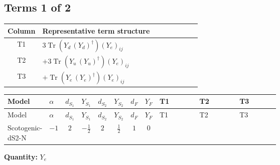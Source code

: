 \documentclass[8pt]{article}
\begin{document}
\begin{landscape}
\subsection*{Terms 1 of 2}
\begin{center}
\begin{tabular}{@{}c >{\raggedright\arraybackslash}p{0.82\linewidth}@{}}
\toprule
Column & Representative term structure \\
\midrule
T1 & \(\displaystyle 3 \operatorname{Tr}\!\left({Y_d}\,\left({Y_d}\right)^{\dagger}\right) \left({Y_e}\right)_{ij}\) \\
\midrule
T2 & \(\displaystyle +3 \operatorname{Tr}\!\left({Y_u}\,\left({Y_u}\right)^{\dagger}\right) \left({Y_e}\right)_{ij}\) \\
\midrule
T3 & \(\displaystyle +\operatorname{Tr}\!\left({Y_e}\,\left({Y_e}\right)^{\dagger}\right) \left({Y_e}\right)_{ij}\) \\
\midrule
\bottomrule
\end{tabular}
\end{center}
\smallskip
\tiny
\begin{longtable}{@{}llcccccc >{\raggedright\arraybackslash}p{0.21\linewidth} >{\raggedright\arraybackslash}p{0.21\linewidth} >{\raggedright\arraybackslash}p{0.21\linewidth}@{}}
\toprule
Model & $\alpha$ & $d_{S_1}$ & $Y_{S_1}$ & $d_{S_2}$ & $Y_{S_2}$ & $d_F$ & $Y_F$ & T1 & T2 & T3 \\
\midrule
\endfirsthead
\toprule
Model & $\alpha$ & $d_{S_1}$ & $Y_{S_1}$ & $d_{S_2}$ & $Y_{S_2}$ & $d_F$ & $Y_F$ & T1 & T2 & T3 \\
\midrule
\endhead
Scotogenic-dS2-N & $-1$ & $2$ & $-\frac{1}{2}$ & $2$ & $\frac{1}{2}$ & $1$ & $0$ & \scriptsize\adjustbox{max width=\linewidth}{$\begin{gathered} 3 \operatorname{Tr}\!\left({Y_d}\,\left({Y_d}\right)^{\dagger}\right) \left({Y_e}\right)_{ij}\end{gathered}$} & \scriptsize\adjustbox{max width=\linewidth}{$\begin{gathered} +3 \operatorname{Tr}\!\left({Y_u}\,\left({Y_u}\right)^{\dagger}\right) \left({Y_e}\right)_{ij}\end{gathered}$} & \scriptsize\adjustbox{max width=\linewidth}{$\begin{gathered} +\operatorname{Tr}\!\left({Y_e}\,\left({Y_e}\right)^{\dagger}\right) \left({Y_e}\right)_{ij}\end{gathered}$} \\
\midrule
\bottomrule
\end{longtable}
\clearpage
\noindent\textbf{Quantity: }$Y_e$\par\smallskip

\end{landscape}
\end{document}
